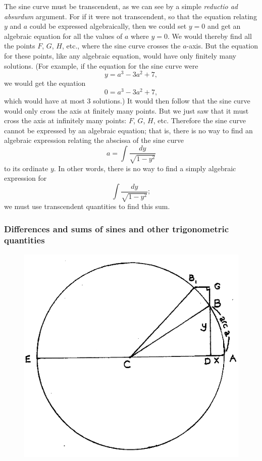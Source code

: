 \documentclass[twoside,openright]{article}
\begin{document}
\label{sintran} The sine curve must be transcendent, as we can see by a simple {\em reductio ad absurdum} argument.  For if it were not transcendent, so that the equation relating $y$ and $a$ could be expressed algebraically, then we could set $y =0$ and get an algebraic equation for all the values of $a$ where $y=0$.  We would thereby find all the points $F$, $G$, $H$, etc., where the sine curve crosses the $a$-axis.  But the equation for these points, like any algebraic equation, would have only finitely many solutions.  
 (For example, if the equation for the sine curve were
 $$y= a^3 -3a^2 + 7,$$
 we would get the equation
 $$ 0 = a^3 -3a^2 +7,$$
 which would have at most 3 solutions.) It would then follow that the sine curve would only cross the axis at finitely many points.  But we just saw that it must cross the axis at infinitely many points: $F$, $G$, $H$, etc.  Therefore the sine curve cannot be expressed by an algebraic equation; that is, there is no way to find an algebraic expression relating the  abscissa of the sine curve
 $$a = \int\! \frac{dy}{\sqrt{1-y^2}}$$
 to its ordinate $y$.  In other words, there is no way to find a simply algebraic expression for 
 $$\int\! \frac{dy}{\sqrt{1-y^2}};$$
 we must use transcendent quantities to find this sum.
 
\subsubsection*{Differences and sums of sines and other trigonometric quantities}


\addtocounter{figure}{-2}
\begin{figure}[hp]
\begin{center}
\includegraphics[width=.65\textwidth]{fig/Figure42}
\caption{}
\label{circarc3}
\vspace{-10pt}
\end{center}
\end{figure}
\end{document}
